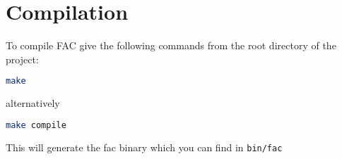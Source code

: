\section{Compilation}

To compile FAC give the following commands from the root directory of 
the project:
\begin{lstlisting}[language=bash,
caption={FAC - compilation},captionpos=b,frame=single]
make
\end{lstlisting}
alternatively
\begin{lstlisting}[language=bash,
caption={FAC - compilation (explicit)},captionpos=b,frame=single]
make compile
\end{lstlisting}
This will generate the fac binary which you can find in \verb|bin/fac|